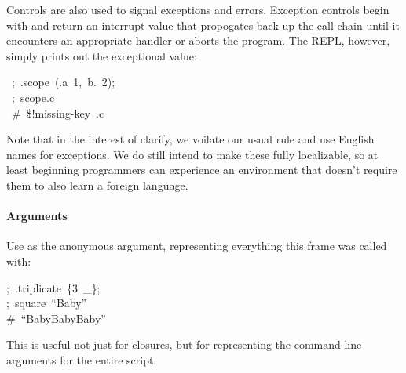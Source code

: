 \documentclass[preprint]{{acmart}}
\begin{document}
\noindent{}Controls are also used to signal exceptions and errors.  Exception controls
begin with  and return an interrupt value that propogates back up the call
chain until it encounters an appropriate handler or aborts the program.  The REPL,
however, simply prints out the exceptional value:%
\begin{mdpre}%
\noindent~;~.scope~(.a~1,~b.~2);\\
~;~scope.c\\
~{\#~\$!missing-key~.c}%
\end{mdpre}\noindent{}Note that in the interest of clarify, we voilate our usual rule and use
English names for exceptions. We do still intend to make these fully
localizable, so at least beginning programmers can experience an environment
that doesn't require them to also learn a foreign language.

\paragraph{Arguments}\label{sec-arguments}%

\noindent{}Use \mdcode{\_} as the anonymous argument, representing everything this frame
was called with:%
\begin{mdpre}%
\noindent;~.triplicate~\{3~\_\};\\
;~square~“{Baby}”\\
{\#~“BabyBabyBaby”}%
\end{mdpre}\noindent{}This is useful not just for closures, but for representing the command-line
arguments for the entire script.
\end{document}
